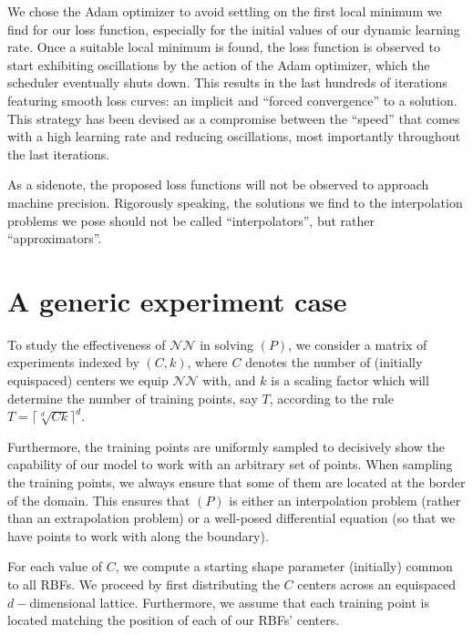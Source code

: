 \documentclass[12pt]{report} %
\begin{document}
We chose the Adam optimizer to avoid settling on the first local minimum we find for our loss function, especially for the initial values of our dynamic learning rate. Once a suitable local minimum is found, the loss function is observed to start exhibiting oscillations by the action of the Adam optimizer, which the scheduler eventually shuts down. This results in the last hundreds of iterations featuring smooth loss curves: an implicit and ``forced convergence'' to a solution. This strategy has been devised as a compromise between the ``speed'' that comes with a high learning rate and reducing oscillations, most importantly throughout the last iterations.

As a sidenote, the proposed loss functions will not be observed to approach machine precision. Rigorously speaking, the solutions we find to the interpolation problems we pose should not be called ``interpolators'', but rather ``approximators''.

\section{A generic experiment case}

To study the effectiveness of $\mathcal{NN}$ in solving $(P)$, we consider a matrix of experiments indexed by $(C,k)$, where $C$ denotes the number of (initially equispaced) centers we equip $\mathcal{NN}$ with, and $k$ is a scaling factor which will determine the number of training points, say $T$, according to the rule
$T = \lceil \sqrt[d]{C  k} \rceil ^d $.

Furthermore, the training points are uniformly sampled to decisively show the capability of our model to work with an arbitrary set of points. When sampling the training points, we always ensure that some of them are located at the border of the domain. This ensures that $(P)$ is either an interpolation problem (rather than an extrapolation problem) or a well-posed differential equation (so that we have points to work with along the boundary).

For each value of $C$, we compute a starting shape parameter (initially) common to all RBFs. We proceed by first distributing the $C$ centers across an equispaced $d-$dimensional lattice. Furthermore, we assume that each training point is located matching the position of each of our RBFs' centers.
\end{document}
